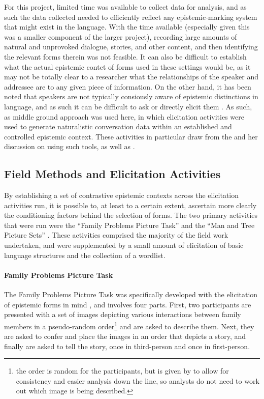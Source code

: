 For this project, limited time was available to collect data for analysis, and as such the data collected needed to efficiently reflect any epistemic-marking system that might exist in the language. With the time available (especially given this was a smaller component of the larger project), recording large amounts of natural and unprovoked dialogue, stories, and other content, and then identifying the relevant forms therein was not feasible. It can also be difficult to establish what the actual epistemic contet of forms used in these settings would be, as it may not be totally clear to a researcher what the relationships of the speaker and addressee are to any given piece of information. On the other hand, it has been noted that speakers are not typically consiously aware of epistemic distinctions in language, and as such it can be difficult to ask or directly elicit them \cite{Grzech2020}. As such, as middle ground approach was used here, in which elicitation activities were used to generate naturalistic conversation data within an established and controlled epistemic context. These activities in particular draw from the  and her discussion on using such tools, as well as . 

\subsection{Field Methods and Elicitation Activities}
By establishing a set of contrastive epistemic contexts across the elicitation activities run, it is possible to, at least to a certain extent, ascertain more clearly the conditioning factors behind the selection of forms. The two primary activities that were run were the ``Family Problems Picture Task'' \cite{SanRoque2012a} and the ``Man and Tree Picture Sets'' \cite{Levinson1992}. These activities comprised the majority of the field work undertaken, and were supplemented by a small amount of elicitation of basic language structures and the collection of a wordlist.

\paragraph{Family Problems Picture Task}\label{p:Methods:FamilyProblems}
The Family Problems Picture Task was specifically developed with the elicitation of epistemic forms in mind \cite{SanRoque2012a}, and involves four parts. First, two participants are presented with a set of images \cite{Carroll2009} depicting various interactions between family members in a pseudo-random order\footnote{the order is random for the participants, but is given by  to allow for consistency and easier analysis down the line, so analysts do not need to work out which image is being described.} and are asked to describe them. Next, they are asked to confer and place the images in an order that depicts a story, and finally are asked to tell the story, once in third-person and once in first-person.

